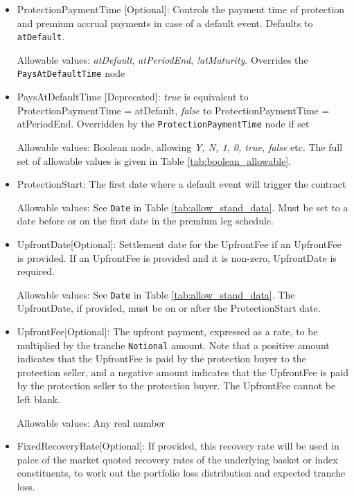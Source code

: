 \begin{itemize}
\item ProtectionPaymentTime [Optional]: Controls the payment time of protection and premium accrual payments in case of  a default event. Defaults to \lstinline!atDefault!. 
 
Allowable values: \emph{atDefault}, \emph{atPeriodEnd},  \emph{!atMaturity}. Overrides the \lstinline!PaysAtDefaultTime! node

\item PaysAtDefaultTime [Deprecated]: \emph{true} is equivalent to ProtectionPaymentTime = atDefault,
  \emph{false} to ProtectionPaymentTime = atPeriodEnd. Overridden by the \lstinline!ProtectionPaymentTime! node if set
  
 Allowable values: Boolean node, allowing \emph{Y, N, 1, 0, true, false} etc. The full set of allowable values is given in Table \ref{tab:boolean_allowable}.  
  
\item ProtectionStart: The first date where a default event will trigger the contract

Allowable values: See \lstinline!Date! in Table \ref{tab:allow_stand_data}. Must be set to a date before or on the first date in the premium leg schedule.

\item UpfrontDate[Optional]: Settlement date for the UpfrontFee if an UpfrontFee is
provided. If an UpfrontFee is provided and it is non-zero, UpfrontDate is required. 

Allowable values: See \lstinline!Date! in Table \ref{tab:allow_stand_data}. The UpfrontDate, if provided, must be on or after the ProtectionStart
date.

\item UpfrontFee[Optional]: The upfront payment, expressed as a rate, to be multiplied by the tranche \lstinline!Notional! amount. Note that a positive amount indicates that the UpfrontFee is paid by the protection buyer to the protection seller, and a negative amount indicates that the UpfrontFee is paid by the protection seller to the protection buyer. The UpfrontFee cannot be left blank.

Allowable values: Any  real number 

\item FixedRecoveryRate[Optional]: If provided, this recovery rate will be used in palce of the market quoted recovery rates of the underlying basket or index constituents, to work out the portfolio loss distribution and expected tranche loss.
  

\end{itemize}
